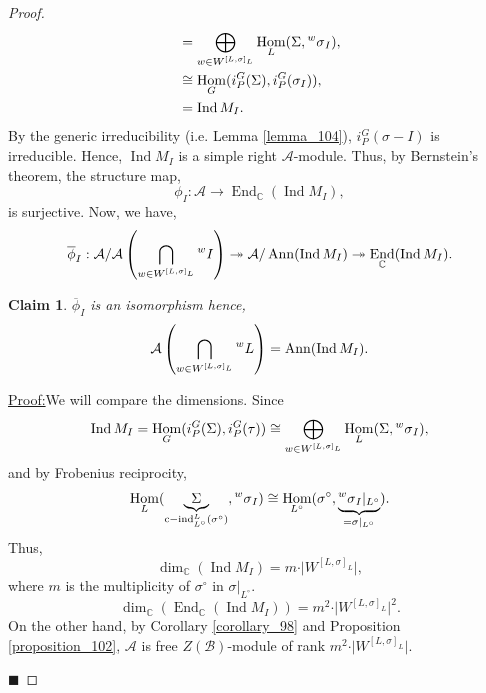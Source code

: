 \documentclass[8pt]{article}
\newtheorem{claim}{Claim}
\newenvironment{claimproof}[1]{\par\noindent\underline{Proof:}\space#1}{\hfill $\blacksquare$}
\DeclareMathOperator{\Ind}{Ind}
\DeclareMathOperator{\cind}{c-ind}
\DeclareMathOperator{\Hom}{Hom}
\DeclareMathOperator{\End}{End}
\DeclareMathOperator{\Ann}{Ann}
\newcommand{\C}[0]{\mathbb{C}}
\newcommand{\cA}{\mathcal{A}}
\newcommand{\cB}{\mathcal{B}}
\begin{document}
\begin{proof}
\begin{align*}
    &=\bigoplus_{w\in W^{[L,\sigma]_L}}\Hom_L(\Sigma,\prescript{w}{}{\sigma}_I),\\
    &\cong \Hom_G(i_P^G(\Sigma),i_P^G(\sigma_I)),\\
    & = \Ind M_I.
  \end{align*}
  By the generic irreducibility (i.e. Lemma \ref{lemma_104}), $i_P^G(\sigma-I)$ is irreducible. Hence, $\Ind M_I$ is a simple right $\cA$-module. Thus, by Bernstein's theorem, the structure map,
  \begin{equation*}
    \phi_I:\cA\to \End_\C(\Ind M_I),
  \end{equation*}
  is surjective. Now, we have,
  \begin{equation*}
    \overline{\phi}_I:\cA/\cA\left(\bigcap_{w\in W^{[L,\sigma]_L}}\prescript{w}{}{I}\right)\twoheadrightarrow\cA/\Ann(\Ind M_I)\twoheadrightarrow\End_\C(\Ind M_I).
  \end{equation*}
  \begin{claim}
    $\overline{\phi}_I$ is an isomorphism hence,
    \begin{equation*}
      \cA\left(\bigcap_{w\in W^{[L,\sigma]_L}}\prescript{w}{}{L}\right)=\Ann(\Ind M_I).
    \end{equation*}
  \end{claim}
  \begin{claimproof}
    We will compare the dimensions. Since 
    \begin{align*}
      \Ind M_I=\Hom_G(i_P^G(\Sigma),i_P^G(\tau))\cong \bigoplus_{w\in W^{[L,\sigma]_L}}\Hom_L(\Sigma,\prescript{w}{}{\sigma}_I),
    \end{align*}
    and by Frobenius reciprocity,
    \begin{equation*}
      \Hom_L(\underbrace{\Sigma}_{\cind_{L^\circ}^L(\sigma^\circ)},\prescript{w}{}{\sigma}_I)\cong \Hom_{L^\circ}(\sigma^\circ,\underbrace{\prescript{w}{}{\sigma}_I|_{L^\circ}}_{=\sigma|_{L^\circ}}).
    \end{equation*}
    Thus,
    \begin{equation*}
      \dim_\C(\Ind M_I)=m\cdot\vert W^{[L,\sigma]_L}\vert,
    \end{equation*}
    where $m$ is the multiplicity of $\sigma^\circ$ in $\sigma|_{L^\circ}$.
    \begin{equation*}
      \dim_\C(\End_\C(\Ind M_I)) = m^2\cdot\vert W^{[L,\sigma]_L}\vert^2.
    \end{equation*}
    On the other hand, by Corollary \ref{corollary_98} and Proposition \ref{proposition_102}, $\cA$ is free $Z(\cB)$-module of rank $m^2\cdot\vert W^{[L,\sigma]_L}\vert$. 

\end{claimproof}
\end{proof}
\end{document}
